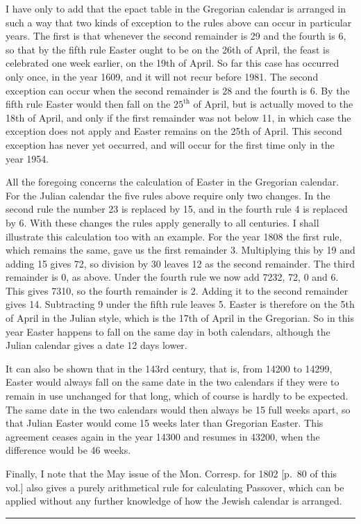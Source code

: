 I have only to add that the epact table in the Gregorian calendar is arranged in such a way that two kinds of exception to the rules above can occur in particular years. The first is that whenever the second remainder is 29 and the fourth is 6, so that by the fifth rule Easter ought to be on the 26th of April, the feast is celebrated one week earlier, on the 19th of April. So far this case has occurred only once, in the year 1609, and it will not recur before 1981. The second exception can occur when the second remainder is 28 and the fourth is 6. By the fifth rule Easter would then fall on the $25^{\mathrm{th}}$ of April, but is actually moved to the 18th of April, and only if the first remainder was not below 11, in which case the exception does not apply and Easter remains on the 25th of April. This second exception has never yet occurred, and will occur for the first time only in the year 1954.

All the foregoing concerns the calculation of Easter in the Gregorian calendar. For the Julian calendar the five rules above require only two changes. In the second rule the number 23 is replaced by 15, and in the fourth rule 4 is replaced by 6. With these changes the rules apply generally to all centuries. I shall illustrate this calculation too with an example. For the year 1808 the first rule, which remains the same, gave us the first remainder 3. Multiplying this by 19 and adding 15 gives 72, so division by 30 leaves %
%
12 as the second remainder. The third remainder is 0, as above. Under the fourth rule we now add 7232, 72, 0 and 6. This gives 7310, so the fourth remainder is 2. Adding it to the second remainder gives 14. Subtracting 9 under the fifth rule leaves 5. Easter is therefore on the 5th of April in the Julian style, which is the 17th of April in the Gregorian. So in this year Easter happens to fall on the same day in both calendars, although the Julian calendar gives a date 12 days lower.

It can also be shown that in the 143rd century, that is, from 14200 to 14299, Easter would always fall on the same date in the two calendars if they were to remain in use unchanged for that long, which of course is hardly to be expected. The same date in the two calendars would then always be 15 full weeks apart, so that Julian Easter would come 15 weeks later than Gregorian Easter. This agreement ceases again in the year 14300 and resumes in 43200, when the difference would be 46 weeks.

Finally, I note that the May issue of the Mon. Corresp. for 1802 [p.~80 of this vol.] also gives a purely arithmetical rule for calculating Passover, which can be applied without any further knowledge of how the Jewish calendar is arranged.

\begin{center}\rule{.25\linewidth}{.3pt}\end{center}

